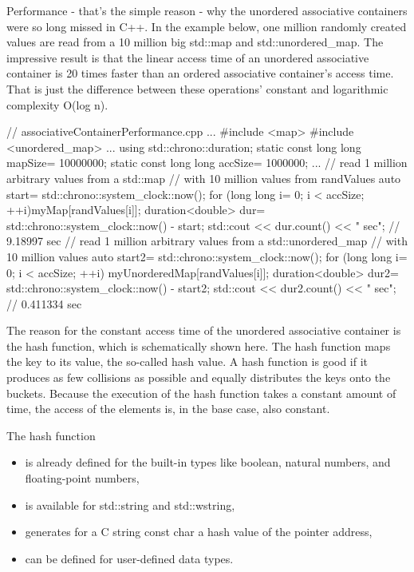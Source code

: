 
Performance - that’s the simple reason - why the unordered associative containers were so long missed in C++. In the example below, one million randomly created values are read from a 10 million big std::map and std::unordered\_map. The impressive result is that the linear access time of an unordered associative container is 20 times faster than an ordered associative container’s access time. That is just the difference between these operations’ constant and logarithmic complexity O(log n).


\begin{cpp}
// associativeContainerPerformance.cpp
...
#include <map>
#include <unordered_map>
...
using std::chrono::duration;
static const long long mapSize= 10000000;
static const long long accSize= 1000000;
...
// read 1 million arbitrary values from a std::map
// with 10 million values from randValues
auto start= std::chrono::system_clock::now();
for (long long i= 0; i < accSize; ++i){myMap[randValues[i]];}
duration<double> dur= std::chrono::system_clock::now() - start;
std::cout << dur.count() << " sec"; // 9.18997 sec
// read 1 million arbitrary values from a std::unordered_map
// with 10 million values
auto start2= std::chrono::system_clock::now();
for (long long i= 0; i < accSize; ++i){ myUnorderedMap[randValues[i]];}
duration<double> dur2= std::chrono::system_clock::now() - start2;
std::cout << dur2.count() << " sec"; // 0.411334 sec
\end{cpp}



The reason for the constant access time of the unordered associative container is the hash function, which is schematically shown here. The hash function maps the key to its value, the so-called hash value. A hash function is good if it produces as few collisions as possible and equally distributes the keys onto the buckets. Because the execution of the hash function takes a constant amount of time, the access of the elements is, in the base case, also constant.

The hash function

\begin{itemize}
\item
is already defined for the built-in types like boolean, natural numbers, and floating-point numbers,

\item
is available for std::string and std::wstring,

\item
generates for a C string const char a hash value of the pointer address,

\item
can be defined for user-defined data types.
\end{itemize}

